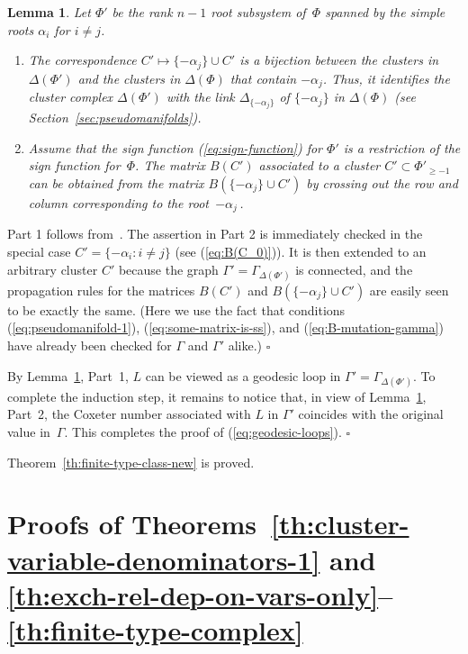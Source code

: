 \documentclass[letterpaper]{amsart}
\numberwithin{equation}{section}
\newtheorem{lemma}[theorem]{Lemma}
\theoremstyle{definition}
\def\proof{\smallskip\noindent {\bf Proof.\ }}
\def\endproof{\hfill$\square$\medskip}
\begin{document}
\begin{lemma} 
\label{lem:restriction} 
Let $\Phi'$ be the rank $n-1$ root subsystem of~$\Phi$ spanned by the 
simple roots $\alpha_i$ for $i\neq j$. 
 
\begin{enumerate} 
 
\item 
The correspondence $C' \mapsto \{-\alpha_j\} \cup C'$ is a 
bijection between the clusters in $\Delta (\Phi')$ and the clusters in 
$\Delta (\Phi)$ that contain $-\alpha_j$. 
Thus, it identifies the cluster complex $\Delta (\Phi')$ 
with the link $\Delta_{\{-\alpha_j\}}$ of $\{-\alpha_j\}$ 
in $\Delta(\Phi)$ (see Section~\ref{sec:pseudomanifolds}). 
 
\item 
Assume that the sign function {\rm (\ref{eq:sign-function})} 
for $\Phi'$ is a restriction of the sign function for~$\Phi$. 
The matrix $B(C')$ 
associated to a cluster $C' \subset \Phi'_{\geq -1}$ can be 
obtained from the matrix $B(\{-\alpha_j\} \cup C')$ by crossing 
out the row and column corresponding to the root~$-\alpha_j\,$. 
\end{enumerate} 
\end{lemma} 
 
\proof 
Part 1 follows from~\cite[Proposition~3.5 (3)]{yga}. 
The assertion in Part 2 is immediately checked in the special case $C' 
=\{-\alpha_i: i \neq j\}$ (see (\ref{eq:B(C_0)})). 
It is then extended to an arbitrary cluster $C'$ because 
the graph $\Gamma' = \Gamma_{\Delta (\Phi')}$ is 
connected, and the propagation rules for the matrices 
 $B(C')$ and $B(\{-\alpha_j\} \cup C')$ are easily seen to be exactly the same. 
(Here we use the fact that conditions 
(\ref{eq:pseudomanifold-1}), (\ref{eq:some-matrix-is-ss}), and (\ref{eq:B-mutation-gamma}) 
have already been checked for $\Gamma$ and $\Gamma'$ alike.) 
\endproof 
 
By Lemma~\ref{lem:restriction}, Part~1, 
$L$ can be viewed as a geodesic loop in 
$\Gamma' = \Gamma_{\Delta (\Phi')}$. 
To complete the induction step, it remains to notice that, 
in view of Lemma~\ref{lem:restriction}, Part~2, 
the Coxeter number associated 
with $L$ in $\Gamma'$ coincides with the original value 
in~$\Gamma$. 
This completes the proof of (\ref{eq:geodesic-loops}). 
\endproof 
 
Theorem~\ref{th:finite-type-class-new} is proved. 
 
\pagebreak[3] 
 
\section{Proofs of Theorems~\ref{th:cluster-variable-denominators-1} 
and \ref{th:exch-rel-dep-on-vars-only}--\ref{th:finite-type-complex}} 
\label{sec:proofs-laurent-etc} 
 
\end{document}
